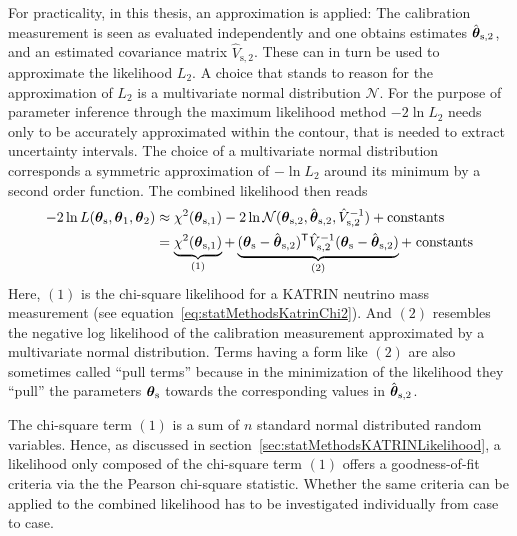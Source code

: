 For practicality, in this thesis, an approximation is applied: The calibration measurement is seen as evaluated independently and one obtains estimates $\hat{\boldsymbol{\mathbf{\theta}}}_\mathrm{s,2}$, and an estimated covariance matrix $\hat{V}_\mathrm{s,2}$. These can in turn be used to approximate the likelihood $L_2$. A choice that stands to reason for the approximation of $L_2$ is a multivariate normal distribution $\mathcal{N}$. For the purpose of parameter inference through the maximum likelihood method $-2\ln L_2$ needs only to be accurately approximated within the contour, that is needed to extract uncertainty intervals. The choice of a multivariate normal distribution corresponds a symmetric approximation of $-\ln L_2$ around its minimum by a second order function. The combined likelihood then reads
\begin{equation}
\begin{split}
\label{eq:katrinElossStatisticsPullTerm}
-2\ln L(\paramVecShared, \paramVec_1, \paramVec_2) &\approx
\chi^2(\paramVecSOne) 
-2\ln \mathcal{N}(\paramVecSTwo, \hat{\paramVec}_\mathrm{s,2}, \hat{V}_\mathrm{s,2}^{-1}) +
\mathrm{ constants}\\ &=
\underbrace{
	\chi^2(\paramVecSOne)
	\vphantom{(\paramVecSTwo - \hat{\paramVec}_\mathrm{s,2})^{\mathsf{T}}}
}_{(1)}
+
\underbrace{
	(\paramVecShared - \hat{\paramVec}_\mathrm{s,2})^{\mathsf{T}}
	\hat{V}_\mathrm{s,2}^{-1}
	(\paramVecShared - \hat{\paramVec}_\mathrm{s,2})
}_{(2)} +\; 
\mathrm{ constants}
\end{split}
\end{equation}
Here, $(1)$ is the chi-square likelihood for a KATRIN neutrino mass measurement (see equation~\ref{eq:statMethodsKatrinChi2}). And $(2)$ resembles the negative log likelihood of the calibration measurement approximated by a multivariate normal distribution. Terms having a form like $(2)$ are also sometimes called ``pull terms'' because in the minimization of the likelihood they ``pull'' the parameters $\boldsymbol{\mathbf{\theta}}_\mathrm{s}$ towards the corresponding values in $\hat{\boldsymbol{\mathbf{\theta}}}_\mathrm{s,2}$.

The chi-square term $(1)$ is a sum of $n$ standard normal distributed random variables. Hence, as discussed in section~\ref{sec:statMethodsKATRINLikelihood}, a likelihood only composed of the chi-square term $(1)$ offers a goodness-of-fit criteria via the the Pearson chi-square statistic. Whether the same criteria can be applied to the combined likelihood has to be investigated individually from case to case.

